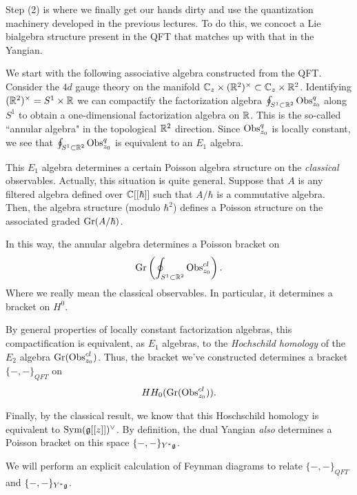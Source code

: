 \documentclass[11pt]{amsart}
\begin{document}
Step (2) is where we finally get our hands dirty and use the quantization machinery developed in the previous lectures. 
To do this, we concoct a Lie bialgebra structure present in the QFT that matches up with that in the Yangian. 

We start with the following associative algebra constructed from the QFT. 
Consider the $4d$ gauge theory on the manifold $\mathbb C_z \times (\mathbb R^2)^\times \subset \mathbb C_z \times \mathbb R^2$. 
Identifying $(\mathbb R^2)^\times = S^1 \times \mathbb R$ we can compactify the factorization algebra $\oint_{S^1 \subset \mathbb R^2} {\rm Obs}^q_{z_0}$ along $S^1$ to obtain a one-dimensional factorization algebra on $\mathbb R$. 
This is the so-called ``annular algebra" in the topological $\mathbb R^2$ direction. 
Since ${\rm Obs}^q_{z_0}$ is locally constant, we see that $\oint_{S^1 \subset \mathbb R^2} {\rm Obs}^q_{z_0}$ is equivalent to an $E_1$ algebra. 

This $E_1$ algebra determines a certain Poisson algebra structure on the {\em classical} observables.
Actually, this situation is quite general. 
Suppose that $A$ is any filtered algebra defined over $\mathbb C[[\hbar]]$ such that $A / \hbar$ is a commutative algebra.
Then, the algebra structure (modulo $\hbar^2$) defines a Poisson structure on the associated graded ${\rm Gr}(A/\hbar)$. 

In this way, the annular algebra determines a Poisson bracket on 
\[
{\rm Gr} \left(\oint_{S^1 \subset \mathbb R^2} {\rm Obs}^{cl}_{z_0}\right) .
\] 
Where we really mean the classical observables. 
In particular, it determines a bracket on $H^0$. 

By general properties of locally constant factorization algebras, this compactification is equivalent, as $E_1$ algebras, to the {\em Hochschild homology} of the $E_2$ algebra ${\rm Gr}({\rm Obs}^{cl}_{z_0})$. 
Thus, the bracket we've constructed determines a bracket $\{-,-\}_{QFT}$ on
\[
HH_0({\rm Gr}({\rm Obs}^{cl}_{z_0})) .
\] 

Finally, by the classical result, we know that this Hoschschild homology is equivalent to ${\rm Sym}(\mathfrak g[[z]])^\vee$.
By definition, the dual Yangian {\em also} determines a Poisson bracket on this space $\{-,-\}_{Y^*\mathfrak g}$. 

We will perform an explicit calculation of Feynman diagrams to relate $\{-,-\}_{QFT}$ and $\{-,-\}_{Y^*\mathfrak g}$. 

%

%


%  

\end{document}
